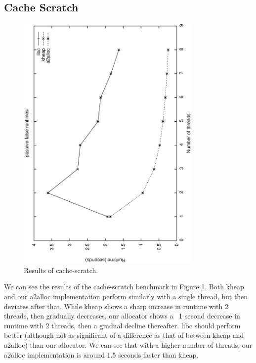 \documentclass[11pt,twoside]{article}
\begin{document}
\subsection{Cache Scratch}
\begin{figure}[!htbp]
    \centering
    \includegraphics[width=0.8\textwidth]{cache-scratch.ps}
    \caption{Results of cache-scratch.}
    \label{fig:scratch}
\end{figure}

We can see the results of the cache-scratch benchmark in Figure \ref{fig:scratch}. Both kheap and our a2alloc implementation perform similarly with a single thread, but then deviates after that. While kheap shows a sharp increase in runtime with 2 threads, then gradually decreases, our allocator shows a ~1 second decrease in runtime with 2 threads, then a gradual decline thereafter. libc should perform better (although not as significant of a difference as that of between kheap and a2alloc) than our allocator. We can see that with a higher number of threads, our a2alloc implementation is around 1.5 seconds faster than kheap.
\end{document}

